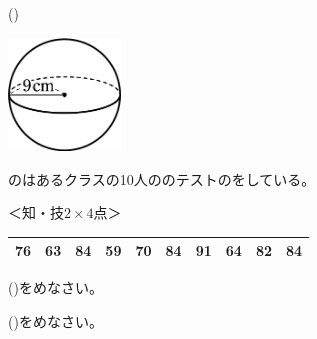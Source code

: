 \documentclass[
  12pt,a4paper,lualatex,ja=standard]{bxjsarticle}
\begin{document}
\begin{flushleft}
\begin{multicols}{3}
\begin{center}
\end{center}

\columnbreak

()\hspace{2.5pt}

\begin{center}
\def\@captype{figure}
\includegraphics[height=30mm]{img/img12.jpg}

\end{center}

\end{multicols}

\vfill

\newpage

\setcounter{skaunta}{0}

\noindent{} \hspace{1pt}のはあるクラスの10人ののテストのをしている。

%
\begin{flushright}%
\footnotesize{＜知・技$2 \times 4$点＞}%
\end{flushright}%


\begin{center}
\begin{tabular}{|cccccccccc|}
\hline
76 & 63 & 84 & 59 & 70 & 84 & 91 & 64 & 82 & 84 \\
\hline
\end{tabular}
\end{center}

\begin{multicols}{2}

()\hspace{2.5pt}をめなさい。

\columnbreak

()\hspace{2.5pt}をめなさい。


\end{multicols}
\end{flushleft}
\end{document}
